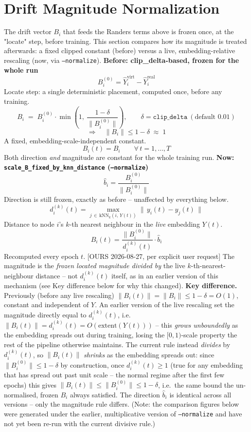 \documentclass{article}
\begin{document}
\section*{Drift Magnitude Normalization}
The drift vector $B_i$ that feeds the Randers terms above is frozen once, at the "locate" step, before training. This section compares how its magnitude is treated afterwards: a fixed clipped constant (before) versus a live, embedding-relative rescaling (now, via \texttt{--normalize}).
\textbf{Before: clip\_delta-based, frozen for the whole run}
\[
B_i^{(0)} = \hat{Y}_i^{\text{virt}} - \hat{Y}_i^{\text{real}}
\]
Locate step: a single deterministic placement, computed once, before any training.
\[
B_i \;=\; B_i^{(0)} \cdot \min\!\left(1,\ \frac{1-\delta}{\|B_i^{(0)}\|}\right),
\qquad \delta = \texttt{clip\_delta}\ (\text{default } 0.01)
\]
\[
\Longrightarrow\quad \|B_i\| \le 1-\delta \;\approx\; 1
\]
A fixed, embedding-scale-independent constant.
\[
B_i(t) = B_i \qquad \forall\, t = 1,\dots,T
\]
Both direction \emph{and} magnitude are constant for the whole training run.
\bigskip
\textbf{Now: \texttt{scale\_B\_fixed\_by\_knn\_distance} (\texttt{--normalize})}
\[
\hat{b}_i = \frac{B_i^{(0)}}{\|B_i^{(0)}\|}
\]
Direction is still frozen, exactly as before -- unaffected by everything below.
\[
d_i^{(k)}(t) = \max_{j \,\in\, \mathrm{kNN}_k(i,\, Y(t))} \big\|\, y_i(t) - y_j(t) \,\big\|
\]
Distance to node $i$'s $k$-th nearest neighbour in the \emph{live} embedding $Y(t)$.
\[
B_i(t) = \frac{\|B_i^{(0)}\|}{d_i^{(k)}(t)} \cdot \hat{b}_i
\]
Recomputed every epoch $t$. [OURS 2026-08-27, per explicit user request] The magnitude is the \emph{frozen located magnitude divided by} the live $k$-th-nearest-neighbour distance -- not $d_i^{(k)}(t)$ itself, as in an earlier version of this mechanism (see Key difference below for why this changed).
\bigskip
\textbf{Key difference.} Previously (before any live rescaling) $\|B_i(t)\| = \|B_i\| \le 1-\delta = O(1)$, constant and independent of $Y$. An earlier version of the live rescaling set the magnitude directly equal to $d_i^{(k)}(t)$, i.e.\ $\|B_i(t)\| = d_i^{(k)}(t) = O(\mathrm{extent}(Y(t)))$ -- this \emph{grows unboundedly} as the embedding spreads out during training, losing the $[0,1)$-scale property the rest of the pipeline otherwise maintains. The current rule instead \emph{divides} by $d_i^{(k)}(t)$, so $\|B_i(t)\|$ \emph{shrinks} as the embedding spreads out: since $\|B_i^{(0)}\| \le 1-\delta$ by construction, once $d_i^{(k)}(t) \ge 1$ (true for any embedding that has spread out past unit scale -- the normal regime after the first few epochs) this gives $\|B_i(t)\| \le \|B_i^{(0)}\| \le 1-\delta$, i.e.\ the same bound the un-normalised, frozen $B_i$ always satisfied. The direction $\hat{b}_i$ is identical across all versions -- only the magnitude rule differs. (Note: the comparison figures below were generated under the earlier, multiplicative version of \texttt{--normalize} and have not yet been re-run with the current divisive rule.)
\end{document}
